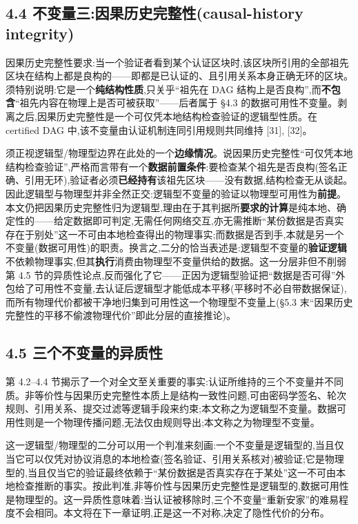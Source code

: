 \documentclass[UTF8,fontset=windows,a4paper,11pt]{ctexart}
\begin{document}
\subsection{4.4 不变量三:因果历史完整性(causal-history
integrity)}\label{ux4e0dux53d8ux91cfux4e09ux56e0ux679cux5386ux53f2ux5b8cux6574ux6027causal-history-integrity}

因果历史完整性要求:当一个验证者看到某个认证区块时,该区块所引用的全部祖先区块在结构上都是良构的------即都是已认证的、且引用关系本身正确无环的区块。须特别说明:它是一个\textbf{纯结构性质},只关乎``祖先在 DAG 结构上是否良构'',而\textbf{不包含}``祖先内容在物理上是否可被获取''------后者属于 §4.3 的数据可用性不变量。剥离之后,因果历史完整性是一个可仅凭本地结构检查验证的逻辑型性质。在 certified DAG 中,该不变量由认证机制连同引用规则共同维持 {[}31{]}, {[}32{]}。

须正视逻辑型/物理型边界在此处的一个\textbf{边缘情况}。说因果历史完整性``可仅凭本地结构检查验证'',严格而言带有一个\textbf{数据前置条件}:要检查某个祖先是否良构(签名正确、引用无环),验证者必须\textbf{已经持有}该祖先区块------没有数据,结构检查无从谈起。因此逻辑型与物理型并非全然正交:逻辑型不变量的验证以物理型可用性为\textbf{前提}。本文仍把因果历史完整性归为逻辑型,理由在于其判据所\textbf{要求的计算}是纯本地、确定性的------给定数据即可判定,无需任何网络交互,亦无需推断``某份数据是否真实存在于别处''这一不可由本地检查得出的物理事实;而数据是否到手,本就是另一个不变量(数据可用性)的职责。换言之,二分的恰当表述是:逻辑型不变量的\textbf{验证逻辑}不依赖物理事实,但其\textbf{执行}消费由物理型不变量供给的数据。这一分层非但不削弱第
4.5
节的异质性论点,反而强化了它------正因为逻辑型验证把``数据是否可得''外包给了可用性不变量,去认证后逻辑型才能低成本平移(平移时不必自带数据保证),而所有物理代价都被干净地归集到可用性这一个物理型不变量上(§5.3
末``因果历史完整性的平移不偷渡物理代价''即此分层的直接推论)。

\subsection{4.5
三个不变量的异质性}\label{ux4e09ux4e2aux4e0dux53d8ux91cfux7684ux5f02ux8d28ux6027}

第 4.2--4.4
节揭示了一个对全文至关重要的事实:认证所维持的三个不变量并不同质。非等价性与因果历史完整性本质上是结构一致性问题,可由密码学签名、轮次规则、引用关系、提交过滤等逻辑手段来约束;本文称之为逻辑型不变量。数据可用性则是一个物理传播问题,无法仅由规则导出;本文称之为物理型不变量。

这一逻辑型/物理型的二分可以用一个判准来刻画:一个不变量是逻辑型的,当且仅当它可以仅凭对协议消息的本地检查(签名验证、引用关系核对)被验证;它是物理型的,当且仅当它的验证最终依赖于``某份数据是否真实存在于某处''这一不可由本地检查推断的事实。按此判准,非等价性与因果历史完整性是逻辑型的,数据可用性是物理型的。这一异质性意味着:当认证被移除时,三个不变量``重新安家''的难易程度不会相同。本文将在下一章证明,正是这一不对称,决定了隐性代价的分布。
\end{document}
